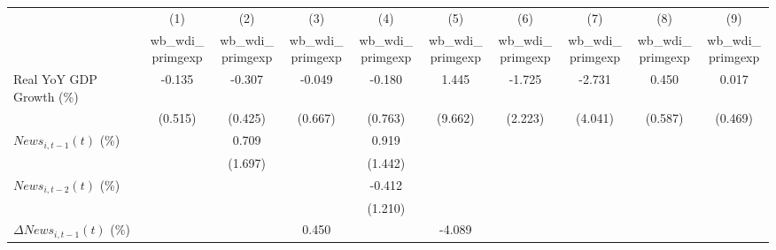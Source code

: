 {
\def\sym#1{\ifmmode^{#1}\else\(^{#1}\)\fi}
\begin{tabular}{l*{9}{c}}
\toprule
                    &\multicolumn{1}{c}{(1)}&\multicolumn{1}{c}{(2)}&\multicolumn{1}{c}{(3)}&\multicolumn{1}{c}{(4)}&\multicolumn{1}{c}{(5)}&\multicolumn{1}{c}{(6)}&\multicolumn{1}{c}{(7)}&\multicolumn{1}{c}{(8)}&\multicolumn{1}{c}{(9)}\\
                    &\multicolumn{1}{c}{wb_wdi_primgexp}&\multicolumn{1}{c}{wb_wdi_primgexp}&\multicolumn{1}{c}{wb_wdi_primgexp}&\multicolumn{1}{c}{wb_wdi_primgexp}&\multicolumn{1}{c}{wb_wdi_primgexp}&\multicolumn{1}{c}{wb_wdi_primgexp}&\multicolumn{1}{c}{wb_wdi_primgexp}&\multicolumn{1}{c}{wb_wdi_primgexp}&\multicolumn{1}{c}{wb_wdi_primgexp}\\
\midrule
Real YoY GDP Growth (\%)&      -0.135         &      -0.307         &      -0.049         &      -0.180         &       1.445         &      -1.725         &      -2.731         &       0.450         &       0.017         \\
                    &     (0.515)         &     (0.425)         &     (0.667)         &     (0.763)         &     (9.662)         &     (2.223)         &     (4.041)         &     (0.587)         &     (0.469)         \\
\addlinespace
$ News_{i,t-1}(t)$ (\%)&                     &       0.709         &                     &       0.919         &                     &                     &                     &                     &                     \\
                    &                     &     (1.697)         &                     &     (1.442)         &                     &                     &                     &                     &                     \\
\addlinespace
$ News_{i,t-2}(t)$ (\%)&                     &                     &                     &      -0.412         &                     &                     &                     &                     &                     \\
                    &                     &                     &                     &     (1.210)         &                     &                     &                     &                     &                     \\
\addlinespace
$ \Delta News_{i,t-1}(t)$ (\%)&                     &                     &       0.450         &                     &      -4.089         &                     &                     &                     &                     \\

\end{tabular}}
